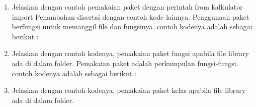 \begin{enumerate}
    \item Jelaskan dengan contoh pemakaian paket dengan perintah from kalkulator import Penambahan disertai dengan contoh kode lainnya.
Penggunaan paket berfungsi untuk memanggil file dan fungsinya. contoh kodenya adalah sebagai berikut :
 

    \item Jelaskan dengan contoh kodenya, pemakaian paket fungsi apabila ﬁle library ada di dalam folder.
 Pemakaian paket adalah perkumpulan fungsi-fungsi. contoh kodenya adalah sebagai berikut :
 

    \item Jelaskan dengan contoh kodenya, pemakaian paket kelas apabila ﬁle library ada di dalam folder.
 

\end{enumerate}

